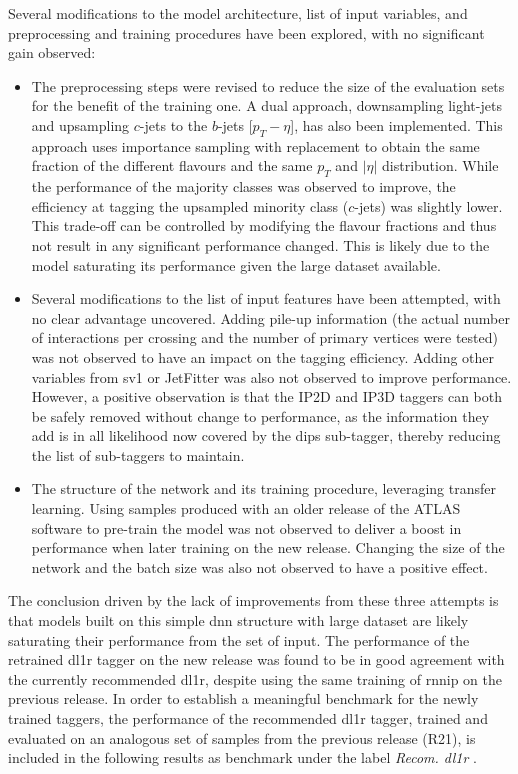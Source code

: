 Several modifications to the model architecture, list of input variables, and preprocessing and training procedures have been explored, with no significant gain observed:
\begin{itemize}
\item The preprocessing steps were revised to reduce the size of the evaluation sets for the benefit of the training one. A dual approach, downsampling light-jets and upsampling $c$-jets to the $b$-jets [$p_T - \eta$], has also been implemented. This approach uses importance sampling with replacement to obtain the same fraction of the different flavours and the same $p_T$ and $|\eta|$ distribution. While the performance of the majority classes was observed to improve, the efficiency at tagging the upsampled minority class ($c$-jets) was slightly lower. This trade-off can be controlled by modifying the flavour fractions and thus not result in any significant performance changed. This is likely due to the model saturating its performance given the large dataset available.  
\item Several modifications to the list of input features have been attempted, with no clear advantage uncovered. Adding pile-up information (the actual number of interactions per crossing and the number of primary vertices were tested) was not observed to have an impact on the tagging efficiency. Adding other variables from \gls{sv1} or JetFitter was also not observed to improve performance. However, a positive observation is that the IP2D and IP3D taggers can both be safely removed without change to performance, as the information they add is in all likelihood now covered by the \gls{dips} sub-tagger, thereby reducing the list of sub-taggers to maintain.
\item The structure of the network and its training procedure, leveraging transfer learning. Using samples produced with an older release of the ATLAS software to pre-train the model was not observed to deliver a boost in performance when later training on the new release. Changing the size of the network and the batch size was also not observed to have a positive effect.
\end{itemize}

The conclusion driven by the lack of improvements from these three attempts is that models built on this simple \gls{dnn} structure with large dataset are likely saturating their performance from the set of input. The performance of the retrained \gls{dl1r} tagger on the new release was found to be in good agreement with the currently recommended \gls{dl1r}, despite using the same training of \gls{rnnip} on the previous release. In order to establish a meaningful benchmark for the newly trained taggers, the performance of the recommended \gls{dl1r} tagger, trained and evaluated on an analogous set of samples from the previous release (R21), is included in the following results as benchmark under the label \textit{Recom. \gls{dl1r} }. \\

